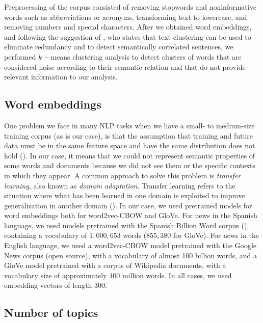 \documentclass{article}
\begin{document}
Preprocessing of the corpus consisted of removing stopwords and noninformative words such as abbreviations or acronyms, transforming text to lowercase, and removing numbers and special characters. After we obtained word embeddings, and following the suggestion of \cite{Abdulateef2019}, who states that text clustering can be used to eliminate redundancy and to detect semantically correlated sentences, we performed $k-$means clustering analysis to detect clusters of words that are considered noise according to their semantic relation and that do not provide relevant information to our analysis.
 
 
\subsection{Word embeddings} 
 
One problem we face in many NLP tasks when we have a small- to medium-size training corpus (as is our case), is that the assumption that training and future data must be in the same feature space and have the same distribution does not hold (\cite{pan_tf2010}). In our case, it means that we could not represent semantic properties of some words and documents because we did not see them or the specific contexts in which they appear. A common  approach to solve this problem is \emph{transfer learning}, also known as \emph{domain adaptation}. Transfer learning refers to the situation where what has been learned in one domain is exploited to improve generalization in another domain (\cite{goodfellow-et-al-2016}). In our case, we used pretrained models for word embeddings both for word2vec-CBOW and GloVe. For news in the Spanish language, we used models pretrained with the Spanish Billion Word corpus (\cite{SpanishBillionWord}), containing a vocabulary of $1,000,653$ words ($855,380$ for GloVe). For news in the English language, we used a word2vec-CBOW model pretrained with the Google News corpus (open source), with a vocabulary of almost 100 billion words, and a GloVe model pretrained with a corpus of Wikipedia documents, with a vocabulary size of approximately 400 million words. In all cases, we used embedding vectors of length $300$.

\subsection{Number of topics}
\end{document}
